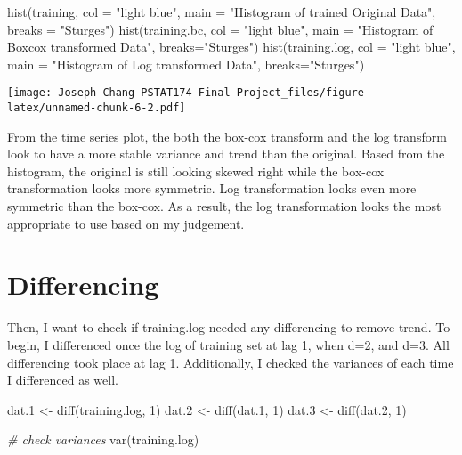 \documentclass[
]{article}
\newenvironment{Shaded}{\begin{snugshade}}{\end{snugshade}}
\newcommand{\AttributeTok}[1]{\textcolor[rgb]{0.77,0.63,0.00}{#1}}
\newcommand{\CommentTok}[1]{\textcolor[rgb]{0.56,0.35,0.01}{\textit{#1}}}
\newcommand{\DecValTok}[1]{\textcolor[rgb]{0.00,0.00,0.81}{#1}}
\newcommand{\FloatTok}[1]{\textcolor[rgb]{0.00,0.00,0.81}{#1}}
\newcommand{\FunctionTok}[1]{\textcolor[rgb]{0.00,0.00,0.00}{#1}}
\newcommand{\NormalTok}[1]{#1}
\newcommand{\OtherTok}[1]{\textcolor[rgb]{0.56,0.35,0.01}{#1}}
\newcommand{\StringTok}[1]{\textcolor[rgb]{0.31,0.60,0.02}{#1}}
\begin{document}
\begin{Shaded}
\begin{Highlighting}[]
\FunctionTok{hist}\NormalTok{(training, }\AttributeTok{col =} \StringTok{"light blue"}\NormalTok{, }\AttributeTok{main =} \StringTok{"Histogram of trained Original Data"}\NormalTok{, }\AttributeTok{breaks =} \StringTok{"Sturges"}\NormalTok{)}
\FunctionTok{hist}\NormalTok{(training.bc, }\AttributeTok{col =} \StringTok{"light blue"}\NormalTok{, }\AttributeTok{main =} \StringTok{"Histogram of Boxcox transformed Data"}\NormalTok{, }\AttributeTok{breaks=}\StringTok{"Sturges"}\NormalTok{)}
\FunctionTok{hist}\NormalTok{(training.log, }\AttributeTok{col =} \StringTok{"light blue"}\NormalTok{, }\AttributeTok{main =} \StringTok{"Histogram of Log transformed Data"}\NormalTok{, }\AttributeTok{breaks=}\StringTok{"Sturges"}\NormalTok{)}
\end{Highlighting}
\end{Shaded}

\texttt{[image: Joseph-Chang---PSTAT174-Final-Project\_files/figure-latex/unnamed-chunk-6-2.pdf]}

From the time series plot, the both the box-cox transform and the log
transform look to have a more stable variance and trend than the
original. Based from the histogram, the original is still looking skewed
right while the box-cox transformation looks more symmetric. Log
transformation looks even more symmetric than the box-cox. As a result,
the log transformation looks the most appropriate to use based on my
judgement.

\hypertarget{differencing}{%
\section{Differencing}\label{differencing}}

Then, I want to check if training.log needed any differencing to remove
trend. To begin, I differenced once the log of training set at lag 1,
when d=2, and d=3. All differencing took place at lag 1. Additionally, I
checked the variances of each time I differenced as well.

\begin{Shaded}
\begin{Highlighting}[]
\NormalTok{dat}\FloatTok{.1} \OtherTok{\textless{}{-}} \FunctionTok{diff}\NormalTok{(training.log, }\DecValTok{1}\NormalTok{)}
\NormalTok{dat}\FloatTok{.2} \OtherTok{\textless{}{-}} \FunctionTok{diff}\NormalTok{(dat}\FloatTok{.1}\NormalTok{, }\DecValTok{1}\NormalTok{)}
\NormalTok{dat}\FloatTok{.3} \OtherTok{\textless{}{-}} \FunctionTok{diff}\NormalTok{(dat}\FloatTok{.2}\NormalTok{, }\DecValTok{1}\NormalTok{)}

\CommentTok{\# check variances}
\FunctionTok{var}\NormalTok{(training.log)}
\end{Highlighting}
\end{Shaded}
\end{document}
